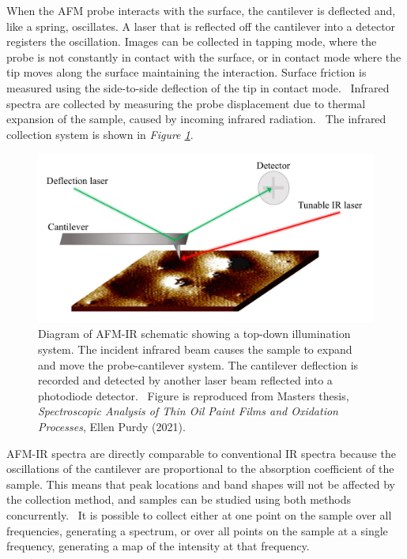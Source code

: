 When the AFM probe interacts with the surface, the cantilever is deflected and, like a spring, oscillates. A laser that is reflected off the cantilever into a detector registers the oscillation. Images can be collected in tapping mode, where the probe is not constantly in contact with the surface, or in contact mode where the tip moves along the surface maintaining the interaction. Surface friction is measured using the side-to-side deflection of the tip in contact mode.~\autocite{friction_afm} Infrared spectra are collected by measuring the probe displacement due to thermal expansion of the sample, caused by incoming infrared radiation.~\autocite{dazzi2017,kurouski} The infrared collection system is shown in \textit{Figure \ref{fig:afm_diagram}}.

\begin{figure}[H]
\centering
  \includegraphics[width=\linewidth]{afm_diagram}
\caption[Diagram of AFM-IR schematic showing a top-down illumination system.]{Diagram of AFM-IR schematic showing a top-down illumination system. The incident infrared beam causes the sample to expand and move the probe-cantilever system. The cantilever deflection is recorded and detected by another laser beam reflected into a photodiode detector.~\autocite{Morsch,dazzi2017} Figure is reproduced from Masters thesis, \textit{Spectroscopic Analysis of Thin Oil Paint Films and Oxidation Processes}, Ellen Purdy (2021).}
\label{fig:afm_diagram}
\end{figure}

AFM-IR spectra are directly comparable to conventional IR spectra because the oscillations of the cantilever are proportional to the absorption coefficient of the sample. This means that peak locations and band shapes will not be affected by the collection method, and samples can be studied using both methods concurrently.~\autocite{dazzi2017,kurouski} It is possible to collect either at one point on the sample over all frequencies, generating a spectrum, or over all points on the sample at a single frequency, generating a map of the intensity at that frequency.

